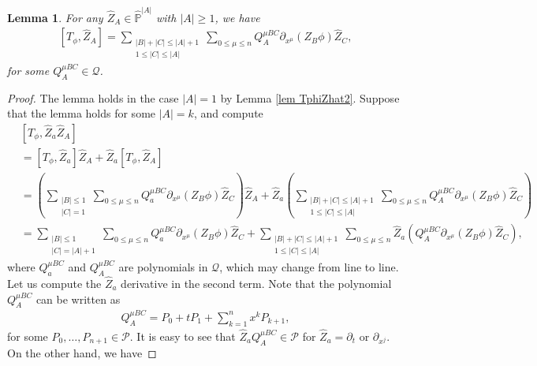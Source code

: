 \documentclass{article}
\newtheorem{lemma}{Lemma}[section]
\newcommand{\bbp}{{\mathbb P}}
\newcommand{\cP}{{\mathcal P}}
\newcommand{\cQ}{{\mathcal Q}}
\begin{document}
%
\begin{lemma} \label{lem TphiZhat3}
For any $ \hat{ Z }_A \in \hat{ \bbp }^{ | A | } $ with $ | A | \geq 1 $, we have
\begin{align*}
\left[ T_\phi , \hat{ Z }_A \right] = \sum_{ \substack{ | B | + | C | \leq | A | + 1 \\ 1 \leq | C | \leq | A | } } \sum_{ 0 \leq \mu \leq n } Q^{ \mu B C }_{ A } \partial_{ x^\mu } ( Z_B \phi ) \hat{ Z }_C ,
\end{align*}
for some $ Q^{ \mu B C }_{ A } \in \cQ $.
\end{lemma}
\begin{proof}
The lemma holds in the case $ | A | = 1 $ by Lemma \ref{lem TphiZhat2}. Suppose that the lemma holds for some $ | A | = k $, and compute
\begin{align*}
& \left[ T_\phi , \hat{ Z }_a \hat{ Z }_A \right] \\
& = \left[ T_\phi , \hat{ Z }_a \right] \hat{ Z }_A + \hat{ Z }_a \left[ T_\phi , \hat{ Z }_A \right] \\
& = \left( \sum_{ \substack{ | B | \leq 1 \\ | C | = 1 } } \sum_{ 0 \leq \mu \leq n } Q^{ \mu B C }_{ a } \partial_{ x^\mu } ( Z_B \phi ) \hat{ Z }_C \right) \hat{ Z }_A + \hat{ Z }_a \left( \sum_{ \substack{ | B | + | C | \leq | A | + 1 \\ 1 \leq | C | \leq | A | } } \sum_{ 0 \leq \mu \leq n } Q^{ \mu B C }_{ A } \partial_{ x^\mu } ( Z_B \phi ) \hat{ Z }_C \right) \\
& = \sum_{ \substack{ | B | \leq 1 \\ | C | = | A | + 1 } } \sum_{ 0 \leq \mu \leq n } Q^{ \mu B C }_{ a } \partial_{ x^\mu } ( Z_B \phi ) \hat{ Z }_C + \sum_{ \substack{ | B | + | C | \leq | A | + 1 \\ 1 \leq | C | \leq | A | } } \sum_{ 0 \leq \mu \leq n } \hat{ Z }_a \left( Q^{ \mu B C }_{ A } \partial_{ x^\mu } ( Z_B \phi ) \hat{ Z }_C \right) ,
\end{align*}
where $ Q^{ \mu B C }_{ a } $ and $ Q^{ \mu B C }_{ A } $ are polynomials in $ \cQ $, which may change from line to line. Let us compute the $ \hat{ Z }_a $ derivative in the second term. Note that the polynomial $ Q^{ \mu B C }_{ A } $ can be written as
\begin{align*}
Q^{ \mu B C }_{ A } =  P_0 + t P_1 + \sum_{ k = 1 }^n x^k P_{ k + 1 } ,
\end{align*}
for some $ P_0 , \dots , P_{ n + 1 } \in \cP $. It is easy to see that $ \hat{ Z }_a Q^{ \mu B C }_{ A } \in \cP $ for $ \hat{ Z }_a = \partial_t $ or $ \partial_{ x^j } $. On the other hand, we have

\end{proof}
\end{document}

